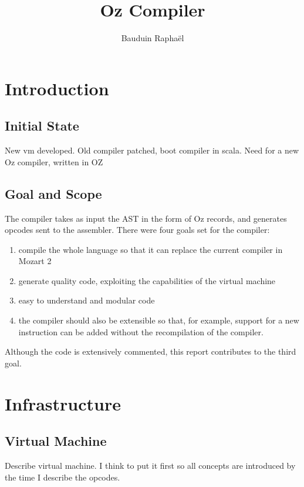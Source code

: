 \documentclass[a4paper]{memoir}
\author{Bauduin Raphaël}
\title{Oz Compiler}
\begin{document}
\lstset{language=Oz}


\ifdraftdoc
{}
\fi

\immediate{} 

\maketitle
\tableofcontents


\chapter{Introduction}
\section{Initial State}
New vm developed.
Old compiler patched, boot compiler in scala.
Need for a new Oz compiler, written in OZ

\section{Goal and Scope}
The compiler takes as input the AST in the form of Oz records, and generates opcodes sent to the assembler. 
There were four goals set for the compiler:
\begin{enumerate}
  \item compile the whole language so that it can replace the current compiler in Mozart 2
  \item generate quality code, exploiting the capabilities of the virtual machine
  \item easy to understand and modular code
  \item the compiler should also be extensible so that, for example, support for a new instruction can be added without the recompilation of the compiler.
\end{enumerate}
Although the code is extensively commented, this report contributes to the third goal.

\chapter{Infrastructure}
\section{Virtual Machine}
Describe virtual machine. I think to put it first so all concepts are introduced by the time I describe the opcodes.
\end{document}

